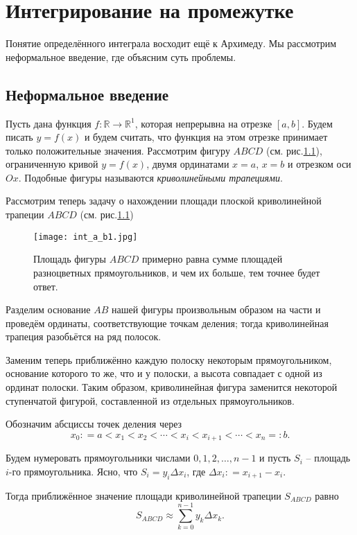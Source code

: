 
\chapter{Интегрирование на промежутке}

Понятие определённого интеграла восходит ещё к Архимеду. Мы рассмотрим неформальное введение, где объясним суть проблемы.

\section{Неформальное введение}

Пусть дана функция $f: \mathbb{R} \to \mathbb{R}^1$, которая непрерывна на отрезке $[a,b]$. Будем писать $y  = f(x)$ и будем считать, что функция на этом отрезке принимает только положительные значения. Рассмотрим фигуру $ABCD$ (см. рис.\ref{int_a_b}), ограниченную кривой $y=f(x)$, двумя ординатами $x = a$, $x =b$ и отрезком оси $Ox.$ Подобные фигуры называются \textit{криволинейными трапециями}.

Рассмотрим теперь задачу о нахождении площади плоской криволинейной трапеции $ABCD$ (см. рис.\ref{int_a_b})

\begin{figure}[h!]
    \centering
    \texttt{[image: int\_a\_b1.jpg]}
    \caption{Площадь фигуры $ABCD$ примерно равна сумме площадей разноцветных прямоугольников, и чем их больше, тем точнее будет ответ.}
    \label{int_a_b}
\end{figure}

Разделим основание $AB$ нашей фигуры произвольным образом на части и проведём ординаты, соответствующие точкам деления; тогда криволинейная трапеция разобьётся на ряд полосок. 

Заменим теперь приближённо каждую полоску некоторым прямоугольником, основание которого то же, что и у полоски, а высота совпадает с одной из ординат полоски. Таким образом, криволинейная фигура заменится некоторой ступенчатой фигурой, составленной из отдельных прямоугольников. 

Обозначим абсциссы точек деления через
\[
 x_0 : = a < x_1 < x_2 < \cdots < x_i < x_{i+1} < \cdots < x_n =:b.
\]

Будем нумеровать прямоугольники числами $0,1,2,\ldots, n-1$ и пусть $S_i$ -- площадь $i$-го прямоугольника. Ясно, что $S_i = y_i \Delta x_i$, где $\Delta x_i: = x_{i+1} - x_i.$

Тогда приближённое значение площади криволинейной трапеции $S_{ABCD}$ равно
\[
 S_{ABCD} \approx \sum_{k = 0}^{n-1} y_k \Delta x_k.
\]

